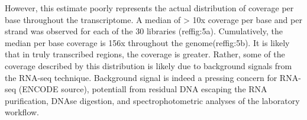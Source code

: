 However, this estimate poorly represents the actual distribution of coverage per base throughout the transcriptome. A median of > 10x coverage per base and per strand was observed for each of the 30 libraries (ref{fig:5a}). Cumulatively, the median per base coverage is 156x throughout the genome(ref{fig:5b}). It is likely that in truly transcribed regions, the coverage is greater. Rather, some of the coverage described by this distribution is likely due to background signals from the RNA-seq technique. Background signal is indeed a pressing concern for RNA-seq (ENCODE source), potentiall from residual DNA escaping the RNA purification, DNAse digestion, and spectrophotometric analyses of the laboratory workflow. 




